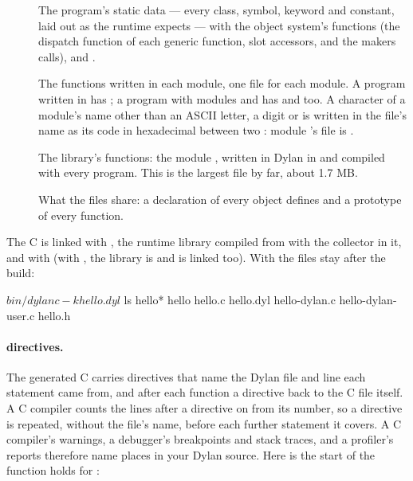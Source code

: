 \begin{description}
\item[] The program's static data --- every class,
  symbol, keyword and constant, laid out as the runtime expects --- with
  the object system's functions (the dispatch function of each generic
  function, slot accessors, and the makers  calls), and
  .
\item[] The functions written in each
  module, one file for each module. A program written in
   has ; a program with
  modules  and  has
   and  too. A
  character of a module's name other than an ASCII letter, a digit or
  \code{-} is written in the file's name as its code in hexadecimal
  between two \code{\_}: module 's file is
  .
\item[] The library's functions: the module
  , written in Dylan in  and compiled
  with every program. This is the largest file by far, about 1.7 MB.
\item[] What the files share: a declaration of every
  object  defines and a prototype of every function.
\end{description}

The C is linked with , the runtime library
compiled from  with the collector in it, and with
 (with , the library is
 and  is
linked too). With  the files stay after the build:

\begin{shell}
$ bin/dylanc -k hello.dyl
$ ls hello*
hello  hello.c  hello.dyl  hello-dylan.c  hello-dylan-user.c  hello.h
\end{shell}

\paragraph{ directives.} 
The generated C carries  directives that name the Dylan file
and line each statement came from, and after each function a directive
back to the C file itself. A C compiler counts the lines after a
directive on from its number, so a directive is repeated, without the
file's name, before each further statement it covers. A C compiler's warnings, a debugger's
breakpoints and stack traces, and a profiler's reports therefore name
places in your Dylan source. Here is the start of the function
 holds for :

